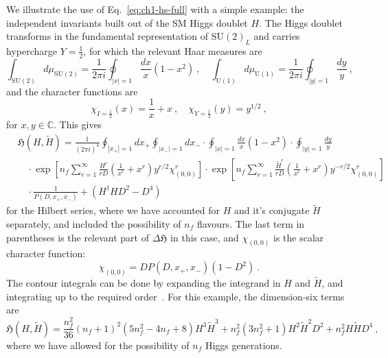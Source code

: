 We illustrate the use of Eq.~\eqref{eq:ch1-hs-full} with a simple example: the
independent invariants built out of the SM Higgs doublet $H$. The Higgs doublet
transforms in the fundamental representation of $\mathrm{SU}(2)_{L}$ and carries
hypercharge $Y=\tfrac{1}{2}$, for which the relevant Haar measures
are~\cite{Hanany:2008sb}
\begin{equation}
  \int_{\mathrm{SU}(2)} d\mu_{\mathrm{SU}(2)} = \frac{1}{2 \pi i} \oint_{|x|=1} \frac{dx}{x} (1 - x^{2}) \ , \quad \int_{\mathrm{U}(1)} d\mu_{\mathrm{U}(1)} = \frac{1}{2 \pi i} \oint_{|y|=1} \frac{dy}{y} \ ,
\end{equation}
and the character functions are~\cite{Lehman:2015via, Feger:2012bs}
\begin{equation}
  \chi_{I=\tfrac{1}{2}}(x) = \frac{1}{x} + x \ , \quad \chi_{Y=\tfrac{1}{2}}(y) = y^{1/2} \ ,
\end{equation}
for $x,y \in \mathbb{C}$. This gives~\cite{Henning:2017fpj}
\begin{equation}
  \begin{aligned}
    &\mathfrak{H}(H, \tilde{H}) = \frac{1}{(2\pi i)^{4}}\oint_{|x_{+}|=1} dx_{+} \oint_{|x_{-}|=1} dx_{-} \cdot \oint_{|x|=1} \frac{dx}{x} (1-x^{2}) \cdot \oint_{|y|=1} \frac{dy}{y} \\
    &\quad \cdot \exp \left[ n_{f} \sum_{r=1}^{\infty} \frac{H^{r}}{r D} \left( \frac{1}{x^{r}} + x^{r} \right) y^{r/2} \chi^{r}_{(0,0)} \right] \cdot \exp \left[ n_{f} \sum_{r=1}^{\infty} \frac{\tilde{H}^{r}}{r D} \left( \frac{1}{x^{r}} + x^{r} \right) y^{-r/2} \chi^{r}_{(0,0)} \right] \\
    &\quad \cdot \frac{1}{P(D, x_{+}, x_{-})} + (H^{\dagger}H D^{2} - D^{4})
  \end{aligned}
\end{equation}
for the Hilbert series, where we have accounted for $H$ and it's conjugate
$\tilde{H}$ separately, and included the possibility of $n_{f}$ flavours. The
last term in parentheses is the relevant part of $\Delta \mathfrak{H}$ in this
case, and $\chi_{(0,0)}$ is the scalar character function:
\begin{equation}
  \chi_{(0,0)} = D P(D, x_{+}, x_{-}) (1 - D^{2}) \ .
\end{equation}
The contour integrals can be done by expanding the integrand in $H$ and
$\tilde{H}$, and integrating up to the required order~\cite{Pouliot:1998yv}. For
this example, the dimension-six terms are
\begin{equation}
  \mathfrak{H}(H, \tilde{H}) = \frac{n_{f}^{2}}{36} (n_{f} + 1)^{2} (5n_{f}^{2}-4n_{f}+8) H^{3}\tilde{H}^{3} + n_{f}^{2}(3n_{f}^{2}+1) H^{2}\tilde{H}^{2}D^{2} + n_{f}^{2} H \tilde{H} D^{4} \ ,
\end{equation}
where we have allowed for the possibility of $n_{f}$ Higgs generations.

